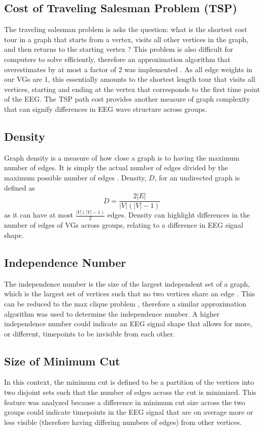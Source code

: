 \documentclass[Afour,times,sageh]{sagej}
\begin{document}
\subsection{Cost of Traveling Salesman Problem (TSP)}
The traveling salesman problem is asks the question: what is the shortest cost tour in a graph that starts from a vertex, visits all other vertices in the graph, and then returns to the starting vertex \citep{Algorithms}? This problem is also difficult for computers to solve efficiently, therefore an approximation algorithm that overestimates by at most a factor of 2 was implemented \citep{Algorithms}. As all edge weights in our VGs are 1, this essentially amounts to the shortest length tour that visits all vertices, starting and ending at the vertex that corresponds to the first time point of the EEG. The TSP path cost provides another measure of graph complexity that can signify differences in EEG wave structure across groups.
\subsection{Density}
Graph density is a measure of how close a graph is to having the maximum number of edges. It is simply the actual number of edges divided by the maximum possible number of edges \citep{Wijk2010}. Density, $D$, for an undirected graph is defined as $$D = \frac{2|E|}{|V|(|V|-1)}$$as it can have at most $\frac{|V|(|V|-1)}{2}$ edges. Density can highlight differences in the number of edges of VGs across groups, relating to a difference in EEG signal shape.
\subsection{Independence Number}
The independence number is the size of the largest independent set of a graph, which is the largest set of vertices such that no two vertices share an edge \citep{Bollobas}. This can be reduced to the max clique problem \citep{Boppana1992}, therefore a similar approximation algorithm was used to determine the independence number. A higher independence number could indicate an EEG signal shape that allows for more, or different, timepoints to be invisible from each other.
\subsection{Size of Minimum Cut}
In this context, the minimum cut is defined to be a partition of the vertices into two disjoint sets such that the number of edges across the cut is minimized. This feature was analyzed because a difference in minimum cut size across the two groups could indicate timepoints in the EEG signal that are on average more or less visible (therefore having differing numbers of edges) from other vertices.
\end{document}
